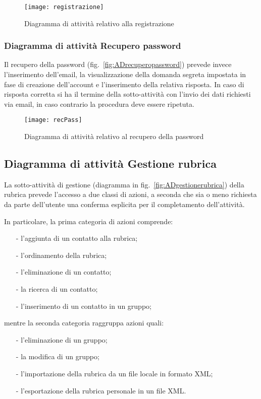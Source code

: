 \begin{figure}[H]
  \centering
  \texttt{[image: registrazione]}
  \caption{Diagramma di attività relativo alla registrazione}\label{fig:ADregistrazione}
\end{figure}

\subsubsection{Diagramma di attività Recupero password}
Il recupero della password (fig.~\vref{fig:ADrecuperopassword}) prevede invece l'inserimento dell'email, la visualizzazione della domanda segreta impostata in fase di creazione dell'account e l'inserimento della relativa risposta. In caso di risposta corretta si ha il termine della sotto-attività con l'invio dei dati richiesti via email, in caso contrario la procedura deve essere ripetuta.

\begin{figure}[H]
  \centering
  \texttt{[image: recPass]}
  \caption{Diagramma di attività relativo al recupero della password}\label{fig:ADrecuperopassword}
\end{figure}

\subsection{Diagramma di attività Gestione rubrica}
La sotto-attività di gestione (diagramma in fig.~\vref{fig:ADgestionerubrica}) della rubrica prevede l'accesso a due classi di azioni, a seconda che sia o meno richiesta da parte dell'utente una conferma esplicita per il completamento dell'attività.

In particolare, la prima categoria di azioni comprende:
\begin{itemize}[noitemsep,nolistsep]
  \item[-] l'aggiunta di un contatto alla rubrica;
  \item[-] l'ordinamento della rubrica;
  \item[-] l'eliminazione di un contatto;
  \item[-] la ricerca di un contatto;
  \item[-] l'inserimento di un contatto in un gruppo;
\end{itemize}
mentre la seconda categoria raggruppa azioni quali:
\begin{itemize}[noitemsep,nolistsep]
  \item[-] l'eliminazione di un gruppo;
  \item[-] la modifica di un gruppo;
  \item[-] l'importazione della rubrica da un file locale in formato XML;
  \item[-] l'esportazione della rubrica personale in un file XML.
\end{itemize}

